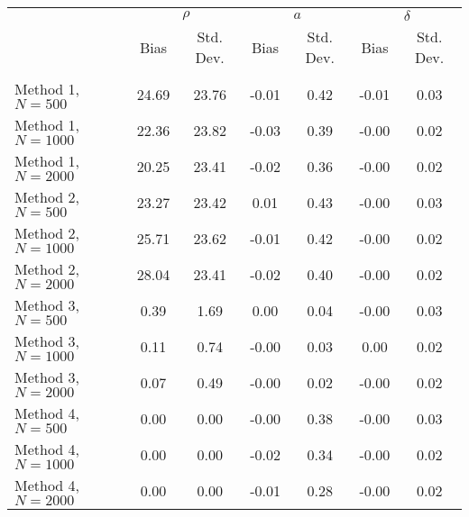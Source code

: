 \begin{tabular}{lcccccc} \\\toprule
 & \multicolumn{2}{c}{$\rho$} & \multicolumn{2}{c}{$a$} & \multicolumn{2}{c}{$\delta$} \\ 
 & Bias & Std. Dev. & Bias & Std. Dev. & Bias & Std. Dev. \\
\cmidrule(r){2-3}\cmidrule(r){4-5}\cmidrule(r){6-7} \\
Method 1, $N=500$ & 24.69 & 23.76 & -0.01 & 0.42 & -0.01 & 0.03\\
Method 1, $N=1000$ & 22.36 & 23.82 & -0.03 & 0.39 & -0.00 & 0.02\\
Method 1, $N=2000$ & 20.25 & 23.41 & -0.02 & 0.36 & -0.00 & 0.02\\
Method 2, $N=500$ & 23.27 & 23.42 & 0.01 & 0.43 & -0.00 & 0.03\\
Method 2, $N=1000$ & 25.71 & 23.62 & -0.01 & 0.42 & -0.00 & 0.02\\
Method 2, $N=2000$ & 28.04 & 23.41 & -0.02 & 0.40 & -0.00 & 0.02\\
Method 3, $N=500$ & 0.39 & 1.69 & 0.00 & 0.04 & -0.00 & 0.03\\
Method 3, $N=1000$ & 0.11 & 0.74 & -0.00 & 0.03 & 0.00 & 0.02\\
Method 3, $N=2000$ & 0.07 & 0.49 & -0.00 & 0.02 & -0.00 & 0.02\\
Method 4, $N=500$ & 0.00 & 0.00 & -0.00 & 0.38 & -0.00 & 0.03\\
Method 4, $N=1000$ & 0.00 & 0.00 & -0.02 & 0.34 & -0.00 & 0.02\\
Method 4, $N=2000$ & 0.00 & 0.00 & -0.01 & 0.28 & -0.00 & 0.02\\
\bottomrule\end{tabular}